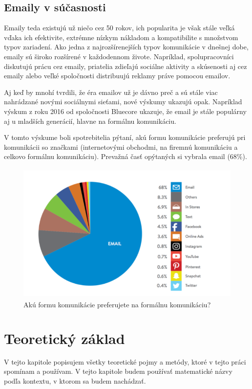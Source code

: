\documentclass[slovak,master,public,dept460,male,cpdeclaration,oneside]{diploma}
\begin{document}
\subsection{Emaily v súčasnosti}
Emaily teda existujú už niečo cez 50 rokov, ich popularita je však stále veľká vďaka ich efektivite, extrémne nízkym nákladom a kompatibilite s množstvom typov zariadení. Ako jedna z najrozšírenejších typov komunikácie v dnešnej dobe, emaily sú široko rozšírené v každodennom živote. Napríklad, spolupracovníci diskutujú prácu cez emaily, priatelia zdieľajú sociálne aktivity a skúsenosti aj cez emaily alebo veľké spoločnosti distribuujú reklamy práve pomocou emailov.

Aj keď by mnohí tvrdili, že éra emailov už je dávno preč a sú stále viac nahrádzané novými sociálnymi sieťami, nové výskumy ukazujú opak. Napríklad výskum z roku 2016 od spoločnosti Bluecore \cite{13} ukazuje, že email je stále populárny aj u mladších generácií, hlavne na formálnu komunikáciu.

V tomto výskume boli spotrebitelia pýtaní, akú formu komunikácie preferujú pri komunikácii so značkami (internetovými obchodmi, na firemnú komunikáciu a celkovo formálnu komunikáciu). Prevažná časť opýtaných si vybrala email (68\%).

\begin{figure}[H]
\centering
\includegraphics[width=12cm, height=7cm]{figures/emailusage}
\caption{Akú formu komunikácie preferujete na formálnu komunikáciu?}
\end{figure}


\section{Teoretický základ}
V tejto kapitole popisujem všetky teoretické pojmy a metódy, ktoré v tejto práci spomínam a používam. V tejto kapitole budem používať matematické názvy podľa kontextu, v ktorom sa budem nachádzať.
\end{document}
